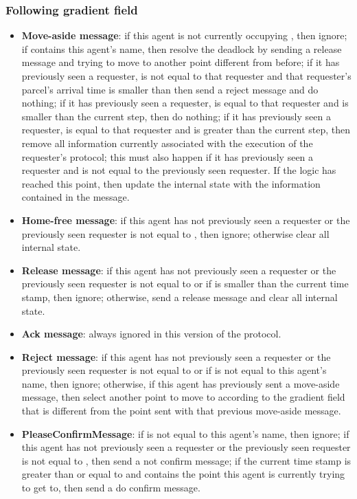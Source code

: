 \subsubsection*{Following gradient field}
\begin{itemize}
    \item \textbf{Move-aside message}: if this agent is not currently occupying , then ignore; if  contains this agent's name, then resolve the deadlock by sending a release message and trying to move to another point different from before; if it has previously seen a requester,  is not equal to that requester and that requester's parcel's arrival time is smaller than  then send a reject message and do nothing; if it has previously seen a requester,  is equal to that requester and  is smaller than the current step, then do nothing; if it has previously seen a requester,  is equal to that requester and  is greater than the current step, then remove all information currently associated with the execution of the requester's protocol; this must also happen if it has previously seen a requester and  is not equal to the previously seen requester. If the logic has reached this point, then update the internal state with the information contained in the message.
    \item \textbf{Home-free message}: if this agent has not previously seen a requester or the previously seen requester is not equal to , then ignore; otherwise clear all internal state.
    \item \textbf{Release message}: if this agent has not previously seen a requester or the previously seen requester is not equal to  or if  is smaller than the current time stamp, then ignore; otherwise, send a release message and clear all internal state.
    \item \textbf{Ack message}: always ignored in this version of the protocol.
    \item \textbf{Reject message}: if this agent has not previously seen a requester or the previously seen requester is not equal to  or if  is not equal to this agent's name, then ignore; otherwise, if this agent has previously sent a move-aside message, then select another point to move to according to the gradient field that is different from the point sent with that previous move-aside message.
    \item \textbf{PleaseConfirmMessage}: if  is not equal to this agent's name, then ignore; if this agent has not previously seen a requester or the previously seen requester is not equal to , then send a not confirm message; if the current time stamp is greater than or equal to  and  contains the point this agent is currently trying to get to, then send a do confirm message.

\end{itemize}

